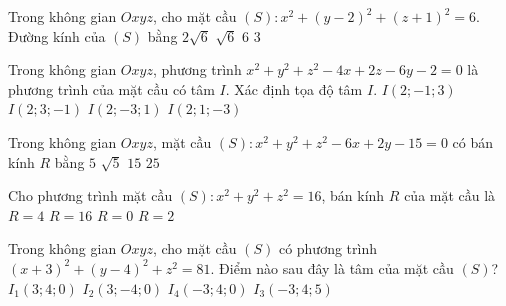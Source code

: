 \begin{ex}%
	Trong không gian $Oxyz$, cho mặt cầu $(S)\colon x^2+(y-2)^2+(z+1)^2=6$. Đường kính của $(S)$  bằng
	\choice 
		 {\True $2\sqrt{6}$}
		 {$\sqrt{6}$}
		{$6$} 
		 {$3$}
\end{ex}

\begin{ex}%
	Trong không gian  $Oxyz$, phương trình
	$x^2+y^2+z^2-4x+2z-6y-2=0$ 
	là phương trình của mặt cầu  có tâm $I$. Xác định tọa độ tâm $I$.
	\choice 
		 {$I(2;-1;3)$}
		 {$I(2;3;-1)$}
		{$I(2;-3;1)$} 
		{\True $I(2;1;-3)$} 
\end{ex}

\begin{ex}%
	Trong không gian $Oxyz$, mặt cầu $(S)\colon x^2+y^2+z^2-6x+2y-15=0$ có bán kính $R$  bằng
	 \choice
		{\True $5$} 
		 {$\sqrt{5}$}
		 {$15$}
		 {$25$}
\end{ex}

\begin{ex}%
	Cho phương  trình mặt cầu $(S)\colon x^2+y^2+z^2=16$, bán kính $R$ của mặt cầu là
	 \choice
		{\True $R=4$} 
		{$R=16$} 
		 {$R=0$}
		{$R=2$} 
\end{ex}

\begin{ex}%
	Trong không gian $Oxyz$, cho mặt cầu $(S)$ có phương trình $(x+3)^{2}+(y-4)^{2}+z^{2}=81$. Điểm nào sau  đây là tâm của mặt cầu $(S)$?
	\choice 
		{$I_{1}(3;4;0)$} 
		{$I_{2}(3;-4;0)$} 
		 {\True $I_{4}(-3;4;0)$}
		{$I_{3}(-3;4;5)$} 
\end{ex}

